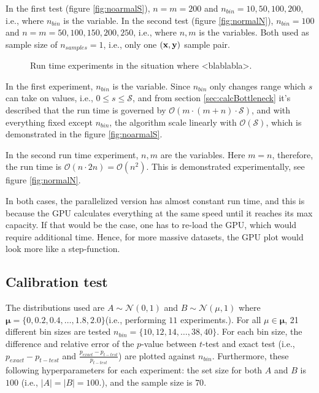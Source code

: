 \documentclass[a4paper,11pt]{article}
\begin{document}
In the first test (figure \ref{fig:noarmalS}), $n=m=200$ and $n_{bin}=10,50,100,200$, i.e., where $n_{bin}$ is the variable. In the second test (figure \ref{fig:normalN}), $n_{bin}=100$ and $n=m=50, 100,150,200,250$, i.e., where $n,m$ is the variables. Both used as sample size of $n_{samples}=1$, i.e., only one $(\bf{x}, \bf{y})$ sample pair.

\FloatBarrier
\begin{figure}[!tbp]
  \centering
  \hfill
  \caption{Run time experiments in the situation where \textless blablabla\textgreater.}
\end{figure}
\FloatBarrier

In the first experiment, $n_{bin}$ is the variable. Since $n_{bin}$ only changes range which $s$ can take on values, i.e., $0 \leq s \leq \mathcal{S}$, and from section \ref{sec:calcBottleneck} it's described that the run time is governed by $\mathcal{O}(m\cdot (m+n)\cdot \mathcal{S})$, and with everything fixed except $n_{bin}$, the algorithm scale linearly with $\mathcal{O}(\mathcal{S})$, which is demonstrated in the figure \ref{fig:noarmalS}.

In the second run time experiment, $n,m$ are the variables. Here $m=n$, therefore, the run time is $\mathcal{O}(n \cdot 2n)=\mathcal{O}(n^{2})$. This is demonstrated experimentally, see figure \ref{fig:normalN}.

In both cases, the parallelized version has almost constant run time, and this is because the GPU calculates everything at the same speed until it reaches its max capacity. If that would be the case, one has to re-load the GPU, which would require additional time. Hence, for more massive datasets, the GPU plot would look more like a step-function.

\subsection{Calibration test}

The distributions used are $A \sim \mathcal{N}(0,1)$ and $B \sim \mathcal{N}(\mu,1)$ where $\boldsymbol{\mu} = \{0, 0.2, 0.4, \ldots, 1.8, 2.0 \}$(i.e., performing $11$ experiments.). For all $\mu \in \boldsymbol{\mu}$, 21 different bin sizes are tested $n_{bin}=\{10,12,14,\ldots,38,40\}$.  For each bin size, the difference and relative error of the $p$-value between $t$-test and exact test (i.e., $p_{exact}-p_{t-test}$  and $\frac{p_{exact}-p_{t-test}}{p_{t-test}}$) are plotted against $n_{bin}$. Furthermore, these following hyperparameters for each experiment: the set size for both $A$ and $B$ is $100$ (i.e., $|A|=|B|=100$.), and the sample size is $70$.
\end{document}
